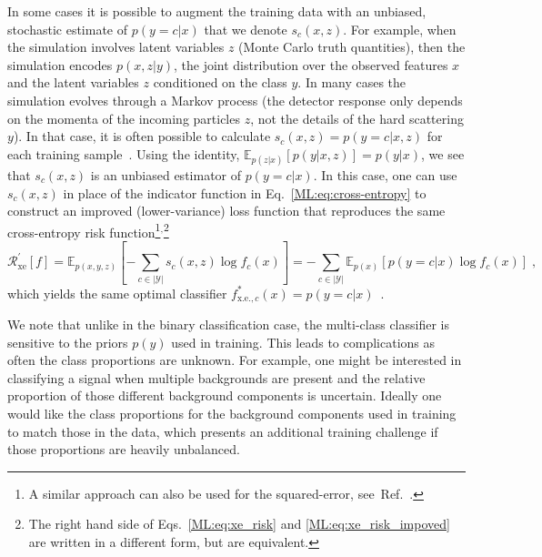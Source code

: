 In some cases it is possible to augment the training data with an unbiased, stochastic estimate of $p(y=c|x)$ that we denote $s_c(x,z)$. For example, when the simulation involves latent variables $z$ (\ie Monte Carlo truth quantities), then the simulation encodes $p(x,z | y)$, the joint distribution over the observed features $x$ and the latent variables $z$ conditioned on the class $y$. In many cases the simulation evolves through a Markov process (\eg the detector response only depends on the momenta of the incoming particles $z$, not the details of the hard scattering $y$). In that case, it is often possible to calculate $s_c(x,z) = p(y=c|x,z)$ for each training sample~\cite{Brehmer:2018eca}. Using the identity, $\mathbb{E}_{p(z|x)}[p(y|x,z)] = p(y|x)$, we see that $s_c(x,z)$ is an unbiased estimator of $p(y=c|x)$. In this case, one can use $s_c(x,z)$ in place of the indicator function in Eq.~\ref{ML:eq:cross-entropy} to construct an improved (lower-variance) loss function that reproduces the same cross-entropy risk function\footnote{A similar approach can also be used for the squared-error, see~Ref.~\cite{Brehmer:2018hga}.}${}^{,}$\footnote{The right hand side of Eqs.~\ref{ML:eq:xe_risk} and \ref{ML:eq:xe_risk_impoved} are written in a different form, but are equivalent.}
\begin{equation}
    \label{ML:eq:xe_risk_impoved}
    \mathcal{R}^\prime_\textrm{xe}[f] = \mathbb{E}_{p(x,y,z)}\left[ - \sum_{c\in |\mathcal{Y}|} s_c(x,z) \log f_c(x) \right]  =  - \sum_{c\in |\mathcal{Y}|}  \mathbb{E}_{p(x)}[ p(y=c|x)\log f_c(x)] \;,
\end{equation}
which yields the same optimal classifier $f^*_{\textrm{x.e.},c}(x) = p(y=c|x)$~\cite{Brehmer:2018hga,Stoye:2018ovl}.




We note that unlike in the binary classification case, the multi-class classifier is sensitive to the priors $p(y)$ used in training. This leads to complications as often the class proportions are unknown. For example, one might be interested in classifying a signal when multiple backgrounds are present and the relative proportion of those different background components is uncertain. Ideally one would like the class proportions for the background components used in training to match those in the data, which presents an additional training challenge if those proportions are heavily unbalanced. 

